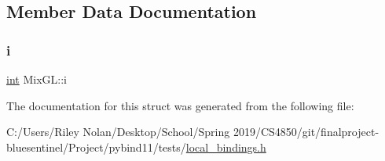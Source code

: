\subsection{Member Data Documentation}
\mbox{\label{struct_mix_g_l_acc5f9e12cbae388da68294bbb1001bdd}} 
\subsubsection{\texorpdfstring{i}{i}}
{\footnotesize\ttfamily \mbox{\hyperlink{warnings_8h_a74f207b5aa4ba51c3a2ad59b219a423b}{int}} Mix\+G\+L\+::i}



The documentation for this struct was generated from the following file\+:\begin{DoxyCompactItemize}
\item 
C\+:/\+Users/\+Riley Nolan/\+Desktop/\+School/\+Spring 2019/\+C\+S4850/git/finalproject-\/bluesentinel/\+Project/pybind11/tests/\mbox{\hyperlink{local__bindings_8h}{local\+\_\+bindings.\+h}}\end{DoxyCompactItemize}
